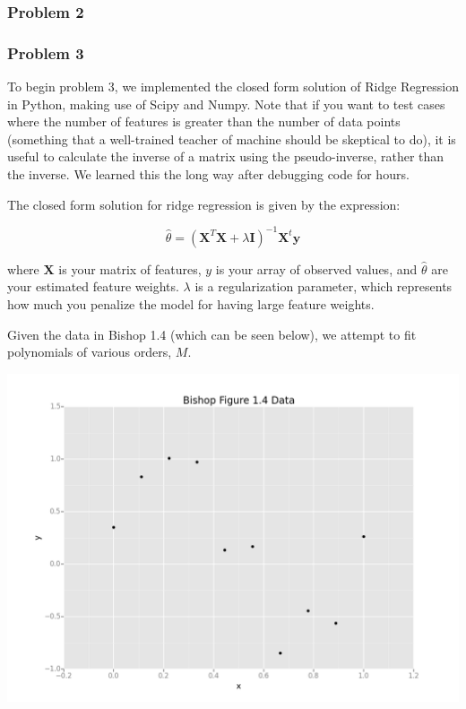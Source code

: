 \documentclass[10pt]{article}
\begin{document}
\subsubsection*{Problem 2}

\subsubsection*{Problem 3}

To begin problem 3, we implemented the closed form solution of Ridge Regression in Python, making use of Scipy and Numpy. Note that if you want to test cases where the number of features is greater than the number of data points (something that a well-trained teacher of machine should be skeptical to do), it is useful to calculate the inverse of a matrix using the pseudo-inverse, rather than the inverse. We learned this the long way after debugging code for hours.

The closed form solution for ridge regression is given by the expression:

\begin{equation}
\hat{\theta} = (\mathbf{X}^T\mathbf{X} + \lambda \mathbf{I})^{-1}\mathbf{X}^t\mathbf{y}
\end{equation}

\noindent where $\mathbf{X}$ is your matrix of features, $y$ is your array of observed values, and $\hat{\theta}$ are your estimated feature weights. $\lambda$ is a regularization parameter, which represents how much you penalize the model for having large feature weights.

Given the data in Bishop 1.4 (which can be seen below), we attempt to fit polynomials of various orders, $M$. 

\begin{center}
\includegraphics[scale=.3]{Bishop_14_Data.png}
\end{center}
\end{document}
